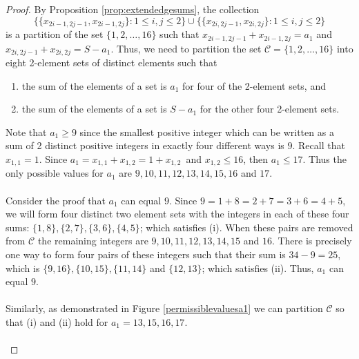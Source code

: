 \documentclass[10pt, reqno]{amsart}
\theoremstyle{definition}
\theoremstyle{plain}
\begin{document}
\begin{proof}
     By Proposition \ref{prop:extendedgesums},
    the collection
\begin{equation}\label{partition1to16}
    \big\{ \{x_{2i-1,2j-1}, x_{2i-1,2j}\} : 1\le i,j\le 2\big\}
    \cup
     \big\{ \{x_{2i,2j-1}, x_{2i,2j}\} : 1\le i,j\le 2\big\}
\end{equation}
is a partition of the set $\{1,2,\ldots,16\}$ such that
$x_{2i-1,2j-1} + x_{2i-1,2j} = a_1$ and
$x_{2i,2j-1} + x_{2i,2j} =S- a_1$.
Thus, we need to partition the set $\mathcal{C}=\{1,2,\ldots,16\}$ into eight 2-element sets of distinct elements such that
  \begin{enumerate}
    \item[(i)]  the sum of the elements of a set is $a_1$ for four of the 2-element sets, and
    \item[(ii)]  the sum of the elements of a set  is $S-a_1$ for the other four 2-element sets.
  \end{enumerate}
   Note that $a_1\ge 9$ since the smallest positive integer which can be written as a sum of 2 distinct positive integers in exactly four different ways is $9$. Recall that $x_{1,1}=1$. Since $a_1=x_{1,1}+x_{1,2}=1+x_{1,2}$\ and $x_{1,2}\le 16$, then $a_1\le 17$.
  Thus the only possible values for $a_1$ are $9,10,11,12,13,14,15,16$ and $17$.\\
  \hspace{.1in}\\
  Consider the proof that $a_1$ can equal $9$.
  Since $9=1+8=2+7=3+6=4+5$, we will form four distinct two element sets with the integers in each of these four sums: $\{1,8\}, \{2,7\}, \{3, 6\}, \{4,5\}$; which satisfies (i). When these pairs are removed from $\mathcal{C}$ the remaining integers are 
  $9,10,11,12,13,14, 15$ and $16$. There is precisely one way to form four pairs of these integers such that their sum is $34-9=25$, which is $\{9, 16\}, \{10, 15\}, \{11, 14 \}$ and $ \{12, 13\}$; which satisfies (ii). Thus, $a_1$ can equal $9$.\\
  \hspace{2in}\\
  Similarly, as demonstrated in Figure \ref{permissiblevaluesa1} we can partition $\mathcal{C}$ so that (i) and (ii) hold for $a_1=13, 15, 16, 17$.\\
  \hspace{2in}\\


\end{proof}
\end{document}
